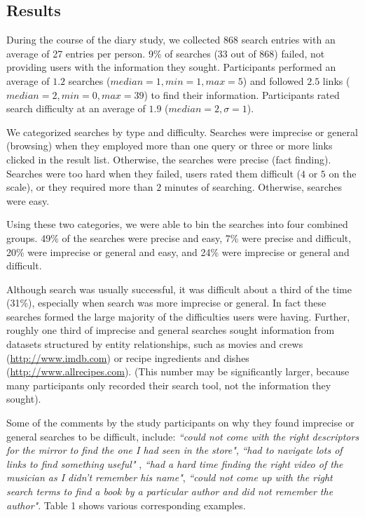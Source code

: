 \subsection{Results}

During the course of the diary study, we collected $868$ search entries with an average of 27 entries per person. 9\% of searches (33 out of 868) failed, not providing users with the information they sought. Participants performed an average of $1.2$ searches ($median=1, min =1, max=5$) and followed $2.5$ links ($median=2, min=0, max=39$) to find their information. Participants rated search difficulty at an average of $1.9$ ($median=2,  \sigma=1$). 

We categorized searches by type and difficulty. Searches were imprecise or general (browsing) when they employed more than one query or three or more links clicked in the result list. Otherwise, the searches were precise (fact finding). Searches were too hard when they failed, users rated them difficult ($4$ or $5$ on the scale), or they required more than $2$ minutes of searching. Otherwise, searches were easy. 

Using these two categories, we were able to bin the searches into four combined groups. 49\% of the searches were precise and easy, 7\% were precise and difficult, 20\% were imprecise or general and easy, and 24\% were imprecise or general and difficult. 

Although search was usually successful, it was difficult about a third of the time (31\%), especially when search was more imprecise or general. In fact these searches formed the large majority of the difficulties users were having. Further, roughly one third of imprecise and general searches sought information from datasets structured by entity relationships, such as movies and crews (\url{http://www.imdb.com}) or recipe ingredients and dishes (\url{http://www.allrecipes.com}). (This number may be significantly larger, because many participants only recorded their search tool, not the information they sought).

Some of the comments by the study participants on why they found imprecise or general searches to be difficult, include: \textit{``could not come with the right descriptors for the mirror to find the one I had seen in the store"}, \textit{``had to navigate lots of links to find something useful"} , \textit{``had a hard time finding the right video of the musician as I didn't remember his name"}, \textit{``could not come up with the right search terms to find a book by a particular author and did not remember the author"}. Table 1 shows various corresponding examples.


